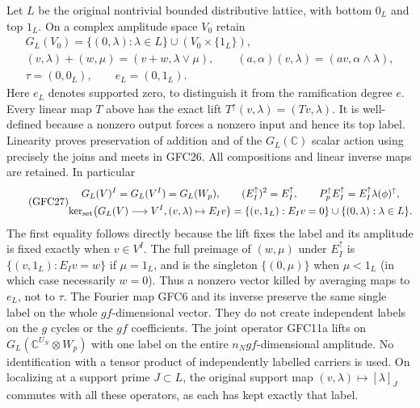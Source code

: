 Let $L$ be the original nontrivial bounded distributive lattice, with
bottom $0_L$ and top $1_L$. On a complex amplitude space $V_0$ retain
\begin{equation}\tag{GFC26}
 \begin{gathered}
 G_L(V_0)=\{(0,\lambda):\lambda\in L\}\cup
                         (V_0\times\{1_L\}),\\
 (v,\lambda)+(w,\mu)=(v+w,\lambda\vee\mu),\qquad
 (a,\alpha)(v,\lambda)=(av,\alpha\wedge\lambda),\\
 \tau=(0,0_L),\qquad e_L=(0,1_L).
 \end{gathered}
\end{equation}
Here $e_L$ denotes supported zero, to distinguish it from the
ramification degree $e$. Every linear map $T$ above has the exact lift
$T^\uparrow(v,\lambda)=(Tv,\lambda)$. It is well-defined because
a nonzero output forces a nonzero input and hence its top label.
Linearity proves preservation of addition and of the
$G_L(\mathbb C)$ scalar action using precisely the joins and meets
in GFC26. All compositions and linear inverse maps are retained.
In particular
\begin{equation}\tag{GFC27}
 \begin{gathered}
 G_L(V)^{I}=G_L(V^I)=G_L(W_p),\qquad
 (E_I^\uparrow)^2=E_I^\uparrow,\qquad
 P_p^\uparrow E_I^\uparrow=E_I^\uparrow\lambda(\phi)^\uparrow,\\
 \ker_{\rm set}\bigl(G_L(V)\longrightarrow V^I,
                         (v,\lambda)\mapsto E_Iv\bigr)
       =\{(v,1_L):E_Iv=0\}\cup\{(0,\lambda):\lambda\in L\}.
 \end{gathered}
\end{equation}
The first equality follows directly because the lift fixes the
label and its amplitude is fixed exactly when $v\in V^I$.
The full preimage of $(w,\mu)$ under $E_I^\uparrow$ is
$\{(v,1_L):E_Iv=w\}$ if $\mu=1_L$, and is the singleton
$\{(0,\mu)\}$ when $\mu<1_L$ (in which case necessarily $w=0$).
Thus a nonzero vector killed by averaging maps to $e_L$, not to
$\tau$. The Fourier map GFC6 and its inverse preserve the same
single label on the whole $gf$-dimensional vector. They do not
create independent labels on the $g$ cycles or the $gf$ coefficients.
The joint operator GFC11a lifts on
$G_L(\mathbb C^{U_N}\otimes W_p)$ with one label on the entire
$n_Ngf$-dimensional amplitude. No identification with a tensor
product of independently labelled carriers is used.
On localizing at a support prime $J\subset L$, the original
support map $(v,\lambda)\mapsto[\lambda]_J$ commutes with all
these operators, as each has kept exactly that label.

